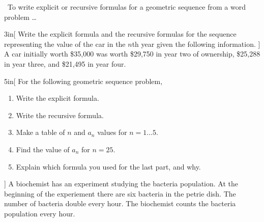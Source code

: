 \begin{myConceptSteps}{~To write explicit or recursive formulas
        for a geometric sequence from a word problem \dots
    }
\end{myConceptSteps}


\begin{myWideProblem}{3in}[%
        Write the explicit formula and the recursive formulas 
        for the sequence representing the value of the car in the $n$th year
        given the following information.
    ]
    {
        A car initially worth \$35,000 
        was worth \$29,750 in year two of ownership, 
        \$25,288 in year three,
        and \$21,495 in year four. 
    }
\end{myWideProblem}

\newpage
\begin{myWideProblem}{5in}[%
    For the following geometric sequence problem,
    \begin{enumerate}[nosep]
        \item Write the explicit formula.
        \item Write the recursive formula.
        \item Make a table of $n$ and $a_n$ values for $n=1\dots5$.
        \item Find the value of $a_n$ for $n=25$.
        \item Explain which formula you used for the last part, and why.
    \end{enumerate}
]
{
    A biochemist has an experiment studying the bacteria population. 
    At the beginning of the experiement there are six bacteria in the petrie dish.
    The number of bacteria double every hour.
    The biochemist counts the bacteria population every hour.
}
\end{myWideProblem}
